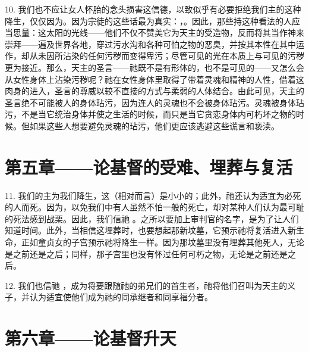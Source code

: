 10. 我们也不应让女人怀胎的念头损害这信德，以致似乎有必要拒绝我们主的这种降生，仅仅因为。因为宗徒的这些话最为真实：，。因此，那些持这种看法的人应当思量：这太阳的光线——他们不仅不赞美它为天主的受造物，反而将其当作神来崇拜——遍及世界各地，穿过污水沟和各种可怕之物的恶臭，并按其本性在其中运作，却从未因所沾染的任何污秽而变得卑污；尽管可见的光在本质上与可见的污秽更为接近。那么，天主的圣言——祂既不是有形体的，也不是可见的——又怎么会从女性身体上沾染污秽呢？祂在女性身体里取得了带着灵魂和精神的人性，借着这肉身的进入，圣言的尊威以较不直接的方式与柔弱的人体结合。由此可见，天主的圣言绝不可能被人的身体玷污，因为连人的灵魂也不会被身体玷污。灵魂被身体玷污，不是当它统治身体并使之生活的时候，而只是当它贪恋身体内可朽坏之物的时候。但如果这些人想要避免灵魂的玷污，他们更应该逃避这些谎言和亵渎。\par


\section{第五章——论基督的受难、埋葬与复活}

11. 我们的主为我们降生，这（相对而言）是小小的；此外，祂还认为适宜为必死的人而死。因为，以免我们中有人虽然不怕一般的死亡，却对某种人们认为最可耻的死法感到战栗。因此，我们信祂 。之所以要加上审判官的名字，是为了让人们知道时间。此外，当相信这埋葬时，也要想起那新坟墓，它预示祂将复活进入新生命，正如童贞女的子宫预示祂将降生一样。因为那坟墓里没有埋葬其他死人，无论是之前还是之后；同样，那子宫里也没有怀过任何可朽之物，无论是之前还是之后。\par

12. 我们也信祂 ，成为将要跟随祂的弟兄们的首生者，祂将他们召叫为天主的义子，并认为适宜使他们成为祂的同承继者和同享福分者。\par


\section{第六章——论基督升天}

